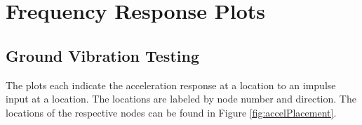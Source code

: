 \chapter{Frequency Response Plots}
\label{ap:frfPlots}

\section{Ground Vibration Testing} %

The plots each indicate the acceleration response at a location to an impulse input at a location. The locations are labeled by node number and direction. The locations of the respective nodes can be found in Figure \ref{fig:accelPlacement}.

